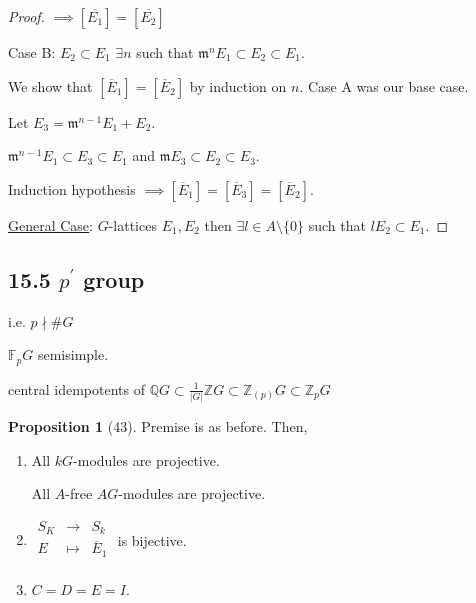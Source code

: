 \documentclass{article}
\theoremstyle{definition}
\newtheorem{proposition}[theorem]{Proposition}
\begin{document}
\begin{proof}
    \(\implies [\overline{E_1}] = [\overline{E_2}]\) 

    Case B: \(E_2 \subset E_1\) \(\exists n\) such that \(\mathfrak{m}^n E_1 \subset E_2 \subset E_1\).

    We show that \([\overline{E}_1] = [\overline{E}_2]\) by induction on \(n\). Case A was our base case.
    
    Let \(E_3 = \mathfrak{m}^{n-1} E_1 + E_2\).

    \(\mathfrak{m}^{n-1} E_1 \subset E_3 \subset E_1\) and \(\mathfrak{m} E_3 \subset E_2 \subset E_3\).

    Induction hypothesis \(\implies [\overline{E}_1] = [\overline{E}_3] = [\overline{E}_2]\).
    
    \underline{General Case}: \(G\)-lattices \(E_1, E_2\) then \(\exists l\in A \setminus \{ 0 \} \) such that \(l E_2 \subset E_1\). 

\end{proof}

\subsection*{15.5 \(p^{\prime}\) group}

i.e. \(p\nmid  \#G\)

\(\mathbb{F}_p G\) semisimple.

central idempotents of \(\mathbb{Q} G \subset \frac{1}{\vert G \vert} \mathbb{Z} G \subset \mathbb{Z}_{(p)} G\subset \mathbb{Z}_p G\) 

\begin{proposition}
    [43] Premise is as before. Then,

    \begin{enumerate}[label=\roman*)]
        \item All \(kG\)-modules are projective.
        
        All \(A\)-free \(AG\)-modules are projective.

        \item \(\begin{matrix}
            S_K & \to &  S_k \\
            E & \mapsto &  \overline{E}_1 \\
        \end{matrix}\) is bijective.

        \item \(C = D = E = I\).
    \end{enumerate} 
\end{proposition}
\end{document}
